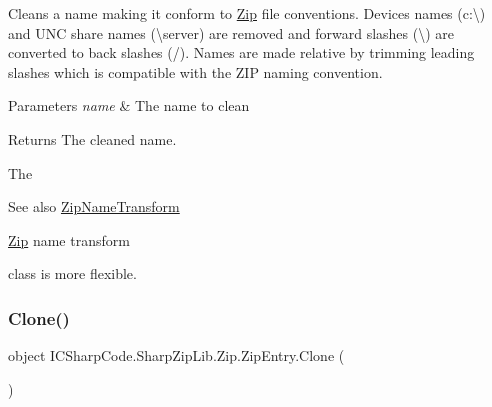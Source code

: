 Cleans a name making it conform to \hyperlink{namespace_i_c_sharp_code_1_1_sharp_zip_lib_1_1_zip}{Zip} file conventions. Devices names (\textquotesingle{}c\+:\textbackslash{}\textquotesingle{}) and U\+NC share names (\textquotesingle{}\textbackslash{}server\textquotesingle{}) are removed and forward slashes (\textquotesingle{}\textbackslash{}\textquotesingle{}) are converted to back slashes (\textquotesingle{}/\textquotesingle{}). Names are made relative by trimming leading slashes which is compatible with the Z\+IP naming convention. 


\begin{DoxyParams}{Parameters}
{\em name} & The name to clean\\
\hline
\end{DoxyParams}
\begin{DoxyReturn}{Returns}
The \textquotesingle{}cleaned\textquotesingle{} name.
\end{DoxyReturn}


The \begin{DoxySeeAlso}{See also}
\hyperlink{class_i_c_sharp_code_1_1_sharp_zip_lib_1_1_zip_1_1_zip_name_transform}{Zip\+Name\+Transform}


\end{DoxySeeAlso}
\hyperlink{namespace_i_c_sharp_code_1_1_sharp_zip_lib_1_1_zip}{Zip} name transform

class is more flexible. \mbox{\label{class_i_c_sharp_code_1_1_sharp_zip_lib_1_1_zip_1_1_zip_entry_a475643d6fac14598ae4b1214c20b2229}} 
\subsubsection{\texorpdfstring{Clone()}{Clone()}\hspace{0.1cm}{\footnotesize\ttfamily [1/2]}}
{\footnotesize\ttfamily object I\+C\+Sharp\+Code.\+Sharp\+Zip\+Lib.\+Zip.\+Zip\+Entry.\+Clone (\begin{DoxyParamCaption}{ }\end{DoxyParamCaption})\hspace{0.3cm}{\ttfamily [inline]}}



